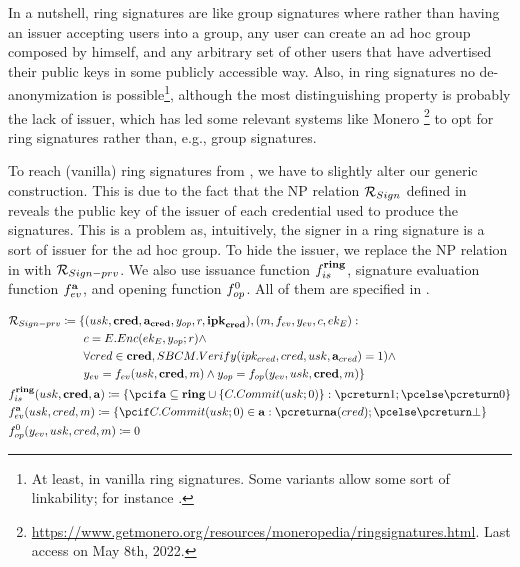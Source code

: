 In a nutshell, ring signatures \cite{rst06} are like group signatures where
rather than having an issuer accepting users into a group, any user can create
an ad hoc group composed by himself, and any arbitrary set of other users that
have advertised their public keys in some publicly accessible way. Also, in
ring signatures no de-anonymization is possible\footnote{At least, in vanilla
  ring signatures. Some variants allow some sort of linkability; for instance
  \cite{lww04}.}, although the most distinguishing property is probably the lack
of issuer, which has led some relevant systems like Monero%
\footnote{\url{https://www.getmonero.org/resources/moneropedia/ringsignatures.html}.
  Last access on May 8th, 2022.} to opt for ring signatures rather than, e.g.,
group signatures.

To reach (vanilla) ring signatures from \UAS, we have to slightly alter our
generic construction. This is due to the fact that the NP relation
$\mathcal{R}_{Sign}$ defined in  reveals the
public key of the issuer of each credential used to produce the signatures.
This is a problem as, intuitively, the signer in a ring
signature is a sort of issuer for the ad hoc group. To hide the issuer, we
replace the NP relation in  with
$\mathcal{R}_{Sign-prv}$. We also use issuance function $f_{is}^{\mathbf{ring}}$,
signature evaluation function $f_{ev}^{\mathbf{a}}$, and opening function
$f_{op}^0$. All of them are specified in .

\begin{align}
  & \NIZKRel_{\Sign-prv} \coloneqq \lbrace (\usk,\scred,\attrs_{\scred},\yinsp,r,
    \sipk_{\scred}),(\msg,\feval,\yeval,\Ec,\Eek): \nonumber \\
  & \hspace*{6.405em}\Ec = \EEnc(\Eek,\yinsp;r) \land \nonumber \\
  & \hspace*{6.40em}\forall \cred \in \scred,\SBCMVerify(\ipk_{\cred},\cred,\usk,
    \attrs_{\cred}) = 1) \land \nonumber \\
  & \hspace*{6.40em}\yeval = \feval(\usk,\scred,\msg) \land
    \yinsp = \finsp(\yeval,\usk,\scred,\msg)
     \rbrace \nonumber \\
  & \fissue^{\sring}(\usk,\scred,\attrs) \coloneqq \lbrace \pcif \attrs
    \subseteq \sring \cup \lbrace \CCommit(\usk;0) \rbrace: \pcreturn 1; \pcelse
    \pcreturn 0 \rbrace \nonumber \\
  & \feval^{\attrs}(\usk,\cred,\msg) \coloneqq \lbrace \pcif \CCommit(\usk;0) \in
    \attrs: \pcreturn \attrs(\cred); \pcelse \pcreturn \bot \rbrace \nonumber \\
  & \finsp^0(\yeval,\usk,\cred,\msg) \coloneqq 0 \label{eq:uas-ring-funcs}
\end{align}

